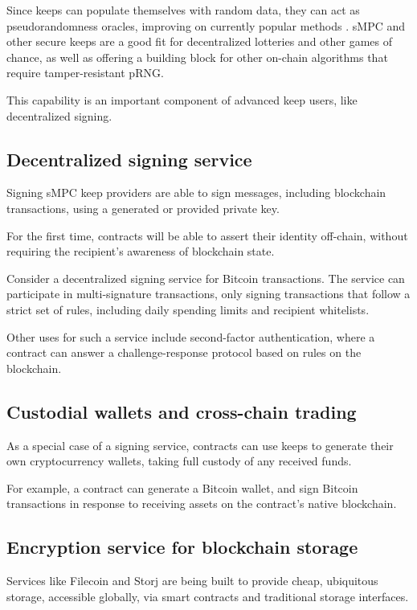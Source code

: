 \documentclass[11pt]{article}
\begin{document}
Since keeps can populate themselves with random data, they can act as
pseudorandomness oracles, improving on currently popular methods
\cite{prngStackexchange}. sMPC and other secure keeps are a good fit for
decentralized lotteries and other games of chance, as well as offering
a building block for other on-chain algorithms that require
tamper-resistant pRNG.

This capability is an important component of advanced keep users, like
decentralized signing.

\subsection{Decentralized signing service}

Signing sMPC keep providers are able to sign messages, including
blockchain transactions, using a generated or provided private key.

For the first time, contracts will be able to assert their identity
off-chain, without requiring the recipient's awareness of blockchain
state.

Consider a decentralized signing service for Bitcoin transactions. The
service can participate in multi-signature transactions, only signing
transactions that follow a strict set of rules, including daily
spending limits and recipient whitelists.

Other uses for such a service include second-factor authentication,
where a contract can answer a challenge-response protocol based on
rules on the blockchain.

\subsection{Custodial wallets and cross-chain trading}

As a special case of a signing service, contracts can use keeps to
generate their own cryptocurrency wallets, taking full custody of any
received funds.

For example, a contract can generate a Bitcoin wallet, and sign
Bitcoin transactions in response to receiving assets on the contract's
native blockchain.

\subsection{Encryption service for blockchain storage}

Services like Filecoin \cite{filecoin} and Storj \cite{storj} are
being built to provide cheap, ubiquitous storage, accessible globally,
via smart contracts and traditional storage interfaces.
\end{document}
